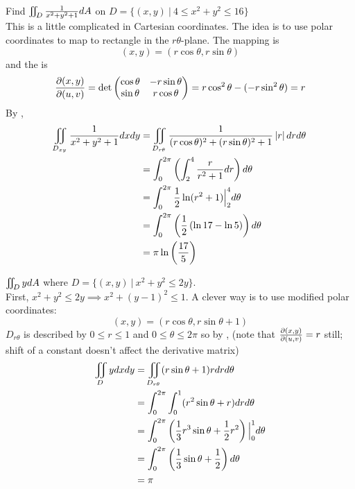\documentclass[english, 11pt]{article}
\begin{document}
\begin{exmp}
  Find $\iint\displaylimits_D \frac{1}{x^2 + y^2 + 1} dA$ on $D = \{ (x,y) \ | \ 4 \leq x^2 + y^2 \leq 16 \}$ \\

  This is a little complicated in Cartesian coordinates. The idea is to use polar coordinates to map to rectangle in the $r\theta$-plane. The mapping is
  \[ (x,y) = (r\cos\theta, r \sin\theta) \]
  and the  is
  \[ \frac{\partial(x,y)}{\partial(u,v)} = \det \left( \begin{matrix} \cos \theta & -r\sin\theta \\ \sin\theta & r\cos\theta \end{matrix} \right) = r\cos^2\theta -(-r\sin^2\theta) = r \]
  By ,
  \begin{align*}
    \iint\displaylimits_{D_{xy}}  \frac{1}{x^2 + y^2 + 1} dxdy & = \iint\displaylimits_{D_{r\theta}}\frac{1}{(r\cos\theta)^2 + (r\sin\theta)^2 + 1} \left|r \right| drd\theta \\
    & = \int_0^{2\pi} \left( \int_2^4 \frac{r}{r^2 + 1} dr \right) d\theta \\
    & = \int_0^{2\pi} \frac{1}{2} \ln(r^2 + 1) \Big|_2^4 d\theta \\
    & = \int_0^{2\pi} \left( \frac{1}{2} \left( \ln 17 - \ln 5 \right) \right) d\theta \\
    & = \pi \ln \left( \frac{17}{5} \right)
  \end{align*}
\end{exmp}

\begin{exmp}
  $\iint\displaylimits_D y dA$ where $D = \{(x,y) \ | \ x^2 + y^2 \leq 2y\}$. \\

  First, $x^2 + y^2 \leq 2y \implies x^2 + (y-1)^2 \leq 1$. A clever way is to use modified polar coordinates:
  \[ (x,y) = (r\cos \theta, r \sin\theta + 1) \]
  $D_{r\theta}$ is described by $0 \leq r \leq 1$ and $0 \leq \theta \leq 2\pi$ so by , (note that $\frac{\partial(x,y)}{\partial(u,v)} = r$ still; shift of a constant doesn't affect the derivative matrix)
  \begin{align*}
    \iint\displaylimits_D ydxdy & = \iint\displaylimits_{D_{r \theta}} (r\sin\theta + 1) r drd\theta \\
    & = \int_0^{2\pi} \int_0^{1} (r^2\sin\theta + r) dr d\theta \\
    & = \int_0^{2\pi} \left( \frac{1}{3} r^3 \sin\theta + \frac{1}{2} r^2 \right) \Big|_0^1 d\theta \\
    & = \int_0^{2\pi} \left( \frac{1}{3}\sin\theta + \frac{1}{2} \right) d\theta \\
    & = \pi
  \end{align*}
\end{exmp}
\end{document}

